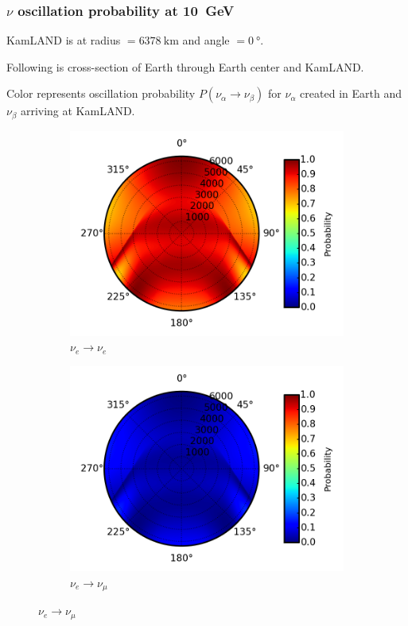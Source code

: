 \documentclass{beamer}
\begin{document}
\begin{frame}
	\frametitle{$\nu$ oscillation probability at \SI{10}{GeV}}
	KamLAND is at radius $= \SI{6378}{\kilo\meter}$ and angle $=
	\SI{0}{\degree}$.

	Following is cross-section of Earth through Earth center and KamLAND.

	Color represents oscillation probability $P(\nu_{\alpha} \rightarrow
	\nu_{\beta})$ for $\nu_{\alpha}$ created in Earth and $\nu_{\beta}$ arriving
	at KamLAND.
	\begin{figure}
		\centering
		\begin{subfigure}[b]{0.49\linewidth}
			\caption{ $\nu_{e} \rightarrow \nu_{e}$ }
			\includegraphics[width=\linewidth]{earth_10.0gev_nue2nue_throughEarth.png}
		\end{subfigure}
		\begin{subfigure}[b]{0.49\linewidth}
			\caption{ $\nu_{e} \rightarrow \nu_{\mu}$ }
			\includegraphics[width=\linewidth]{earth_10.0gev_nue2numu_throughEarth.png}
		\end{subfigure}
	\end{figure}
\end{frame}
\end{document}
